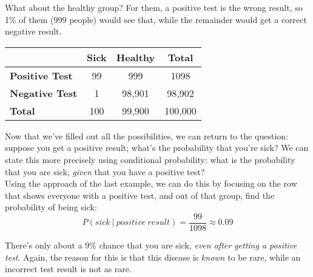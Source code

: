 What about the healthy group?  For them, a positive test is the wrong result, so 1\% of them (999 people) would see that, while the remainder would get a correct negative result.
\begin{center}
\begin{tabular}{l | c c | c}
& \textbf{Sick} & \textbf{Healthy} & \textbf{Total}\\ \hline
\textbf{Positive Test} & 99 & 999 & 1098\\
\textbf{Negative Test} & 1 & 98,901 & 98,902\\ \hline
\textbf{Total} & 100 & 99,900 & 100,000
\end{tabular}
\end{center}

Now that we've filled out all the possibilities, we can return to the question: suppose you get a positive result; what's the probability that you're sick?  We can state this more precisely using conditional probability: what is the probability that you are sick, \emph{given} that you have a positive test?\\

Using the approach of the last example, we can do this by focusing on the row that shows everyone with a positive test, and out of that group, find the probability of being sick:
\[P(sick\ |\ positive\ result) = \dfrac{99}{1098} \approx 0.09\]

There's only about a 9\% chance that you are sick, \emph{even after getting a positive test}.  Again, the reason for this is that this disease is \emph{known} to be rare, while an incorrect test result is not as rare.\\

\begin{comment}
We can use a little algebra to write that last line in general form: since
\[P(A \textrm{ and } B) = P(A) \cdot P(B\ |\ A),\]
we can rewrite this by solving for the conditional probability (divide both sides by $P(A)$).

\begin{formula}{Conditional Probability}
Conditional probability can be calculated as follows, if $P(A \textrm{ and } B)$ and $P(A)$ are both known:
\[P(B\ |\ A) = \dfrac{P(A \textrm{ and } B)}{P(A)}\]
\end{formula}

In the example of the medical test, it looks like
\[P(sick\ |\ positive\ result) = \dfrac{P(sick \textrm{ and } positive\ result)}{P(positive\ result)}\]
and, of course, these probabilities can be found on the contingency table as well.
\end{comment}